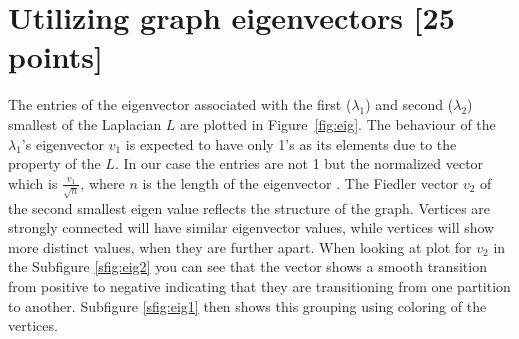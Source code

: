 \newpage
\section{Utilizing graph eigenvectors [25 points]}
The entries of the eigenvector associated with the first ($\lambda_1$) and second ($\lambda_2$) smallest of the Laplacian $L$ are plotted in Figure~\ref{fig:eig}. The behaviour of the $\lambda_1$'s eigenvector $v_1$ is expected to have only 1's as its elements due to the property of the $L$. In our case the entries are not 1 but the normalized vector which is  $\frac{v_1}{\sqrt{n}}$, where $n$ is the length of the eigenvector \cite{noauthor_smallest_nodate}. The Fiedler vector $v_2$ of the second smallest eigen value reflects the structure of the graph. Vertices are strongly connected will have similar eigenvector values, while vertices will show more distinct values, when they are further apart. When looking at plot for $v_2$ in the Subfigure \ref{sfig:eig2} you can see that the vector shows a smooth transition from positive to negative indicating that they are transitioning from one partition to another. Subfigure \ref{sfig:eig1} then shows this grouping using coloring of the vertices.
